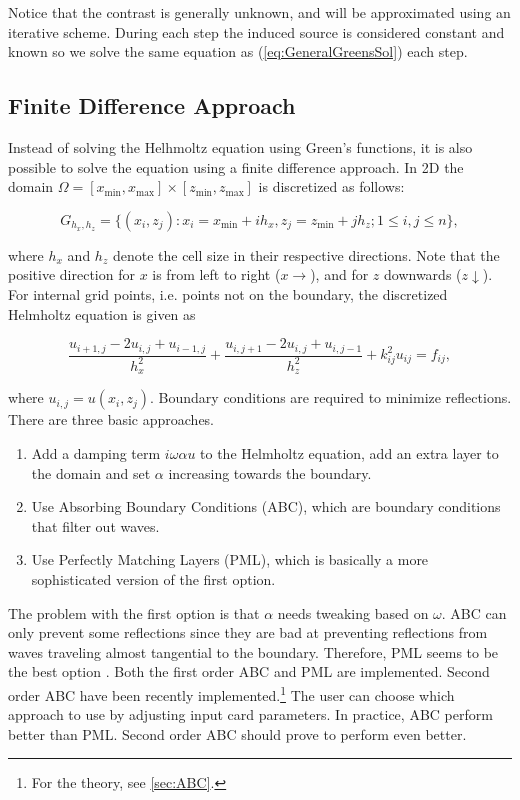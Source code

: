 \documentclass[10pt,a4paper]{article}
\begin{document}
Notice that the contrast is generally unknown, and will be
approximated using an iterative scheme. During each step the induced
source is considered constant and known so we solve the same
equation as (\ref{eq:GeneralGreensSol}) each step.

\subsection{Finite Difference Approach}
Instead of solving the Helhmoltz equation using Green's functions, it is also possible to solve the equation using a finite difference approach. In 2D the domain $\Omega=[x_{\min},x_{\max}]\times [z_{\min},z_{\max}]$ is discretized as follows:

\begin{equation}
G_{h_x,h_z} = \{(x_i,z_j): x_i = x_{\min}+ ih_x, z_j=z_{\min}+jh_z; 1\leq i,j\leq n\},
\end{equation} 

where $h_x$ and $h_z$ denote the cell size in their respective directions. Note that the positive direction for $x$ is from left to right ($x\rightarrow$), and for $z$ downwards ($z\downarrow$). For internal grid points, i.e. points not on the boundary, the discretized Helmholtz equation is given as 

\begin{equation} \label{eqn:discret}
\frac{u_{i+1,j}-2u_{i,j}+u_{i-1,j}}{h_x^2} + \frac{u_{i,j+1}-2u_{i,j}+u_{i,j-1}}{h_z^2} + k_{ij}^2u_{ij}= f_{ij},
\end{equation}

where $u_{i,j}=u(x_i,z_j)$. Boundary conditions are required to minimize reflections. There are three basic approaches.
\begin{enumerate}
	\item Add a damping term $i\omega\alpha u$ to the Helmholtz equation, add an extra layer to the domain and set $\alpha$ increasing towards the boundary.
	\item Use Absorbing Boundary Conditions (ABC), which are boundary conditions that filter out waves.
	\item Use Perfectly Matching Layers (PML), which is basically a more sophisticated version of the first option.
\end{enumerate}

The problem with the first option is that $\alpha$ needs tweaking based on $\omega$. ABC can only prevent some reflections since they are bad at preventing reflections from waves traveling almost tangential to the boundary. Therefore, PML seems to be the best option \cite{Comparison}. Both the first order ABC and PML are implemented. Second order ABC have been recently implemented.\footnote{For the theory, see \cref{sec:ABC}.} The user can choose which approach to use by adjusting input card parameters. In practice, ABC perform better than PML. Second order ABC should prove to perform even better.
\end{document}
